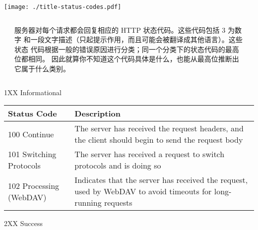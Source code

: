 \documentclass[final,table]{beamer}
\begin{document}
  \begin{frame}{}

    \begin{minipage}{\textwidth}
      \centering
      \texttt{[image: ./title-status-codes.pdf]}
    \end{minipage}

    \vspace{0.5in}

    \begin{columns}
      \begin{column}{0.05\textwidth}
      \end{column}
      \begin{column}{0.9\textwidth}
        \begin{block}{}
          \normalsize
            服务器对每个请求都会回复相应的 HTTP 状态代码。这些代码包括 3 为数字
            和一段文字描述（只起提示作用，而且可能会被翻译成其他语言）。这些状态
            代码根据一般的错误原因进行分类；同一个分类下的状态代码的最高位都相同。
            因此就算你不知道这个代码具体是什么，也能从最高位推断出它属于什么类别。
          \normalsize
        \end{block}
      \end{column}
      \begin{column}{0.05\textwidth}
      \end{column}
    \end{columns}

    \vspace{0.5in}

    \begin{block}{\huge 1XX Informational}

      \vspace{0.3in}

      \begin{tabular}{p{} p{}}
        Status Code & Description \\ \hline
        100 Continue & The server has received the request headers, and the client should begin to send the request body \\
        101 Switching Protocols & The server has received a request to switch protocols and is doing so \\
        102 Processing (WebDAV) & Indicates that the server has received the request, used by WebDAV to avoid timeouts for long-running requests \\
      \end{tabular}
    \end{block}
    \begin{block}{\huge 2XX Success}


\end{block}
\end{frame}
\end{document}
